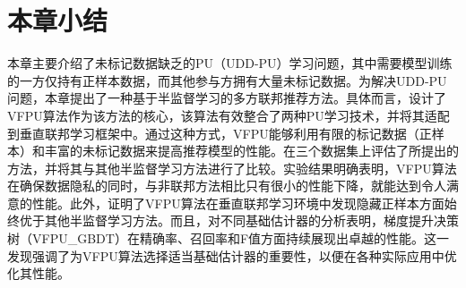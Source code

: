 \section{本章小结}
本章主要介绍了未标记数据缺乏的PU（UDD-PU）学习问题，其中需要模型训练的一方仅持有正样本数据，而其他参与方拥有大量未标记数据。为解决UDD-PU问题，本章提出了一种基于半监督学习的多方联邦推荐方法。具体而言，设计了VFPU算法作为该方法的核心，该算法有效整合了两种PU学习技术，并将其适配到垂直联邦学习框架中。通过这种方式，VFPU能够利用有限的标记数据（正样本）和丰富的未标记数据来提高推荐模型的性能。在三个数据集上评估了所提出的方法，并将其与其他半监督学习方法进行了比较。实验结果明确表明，VFPU算法在确保数据隐私的同时，与非联邦方法相比只有很小的性能下降，就能达到令人满意的性能。此外，证明了VFPU算法在垂直联邦学习环境中发现隐藏正样本方面始终优于其他半监督学习方法。而且，对不同基础估计器的分析表明，梯度提升决策树（VFPU\_GBDT）在精确率、召回率和F值方面持续展现出卓越的性能。这一发现强调了为VFPU算法选择适当基础估计器的重要性，以便在各种实际应用中优化其性能。